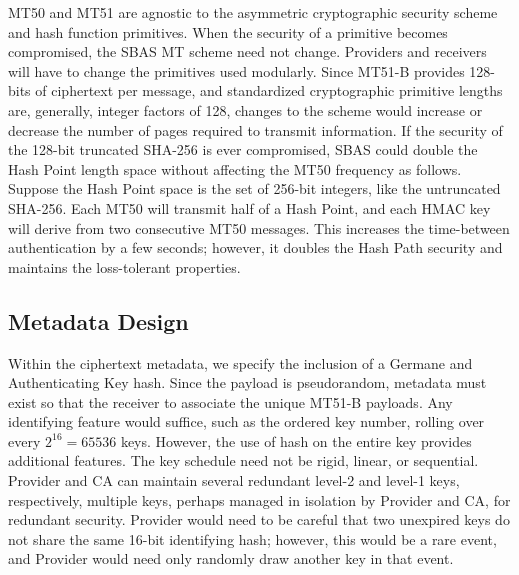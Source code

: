 \documentclass[letterpaper,times]{IONconf/IONconf}
\begin{document}
	MT50 and MT51 are agnostic to the asymmetric cryptographic security scheme and hash function primitives.
	When the security of a primitive becomes compromised, the SBAS MT scheme need not change.
	Providers and receivers will have to change the primitives used modularly.
	Since MT51-B provides 128-bits of ciphertext per message, and standardized cryptographic primitive lengths are, generally, integer factors of 128, changes to the scheme would increase or decrease the number of pages required to transmit information.
	If the security of the 128-bit truncated SHA-256 is ever compromised, SBAS could double the Hash Point length space without affecting the MT50 frequency as follows.
	Suppose the Hash Point space is the set of 256-bit integers, like the untruncated SHA-256.
	Each MT50 will transmit half of a Hash Point, and each HMAC key will derive from two consecutive MT50 messages.
	This increases the time-between authentication by a few seconds; however, it doubles the Hash Path security and maintains the loss-tolerant properties.

	\subsection{Metadata Design} \label{sub:metadata_design}

		Within the ciphertext metadata, we specify the inclusion of a Germane and Authenticating Key hash.
		Since the payload is pseudorandom, metadata must exist so that the receiver to associate the unique MT51-B payloads.
		Any identifying feature would suffice, such as the ordered key number, rolling over every $2^{16} = 65536$ keys.
		However, the use of hash on the entire key provides additional features.
		The key schedule need not be rigid, linear, or sequential.
		Provider and CA can maintain several redundant level-2 and level-1 keys, respectively, multiple keys, perhaps managed in isolation by Provider and CA, for redundant security.
		Provider would need to be careful that two unexpired keys do not share the same 16-bit identifying hash; however, this would be a rare event, and Provider would need only randomly draw another key in that event.
\end{document}
